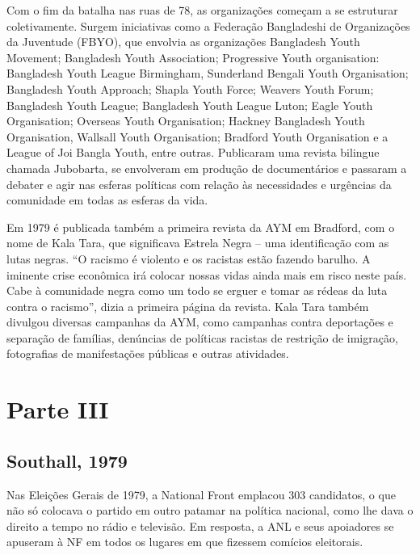 Com o fim da batalha nas ruas de 78, as organizações começam a se estruturar coletivamente. Surgem iniciativas como a Federação Bangladeshi de Organizações da Juventude (FBYO), que envolvia as organizações Bangladesh Youth Movement; Bangladesh Youth Association; Progressive Youth organisation: Bangladesh Youth League Birmingham, Sunderland Bengali Youth Organisation; Bangladesh Youth Approach; Shapla Youth Force; Weavers Youth Forum; Bangladesh Youth League; Bangladesh Youth League Luton; Eagle Youth Organisation; Overseas Youth Organisation; Hackney Bangladesh Youth Organisation, Wallsall Youth Organisation; Bradford Youth Organisation e a League of Joi Bangla Youth, entre outras. Publicaram uma revista bilingue chamada Jubobarta, se envolveram em produção de documentários e passaram a debater e agir nas esferas políticas com relação às necessidades e urgências da comunidade em todas as esferas da vida.


Em 1979 é publicada também a primeira revista da AYM em Bradford, com o nome de Kala Tara, que significava Estrela Negra – uma identificação com as lutas negras. “O racismo é violento e os racistas estão fazendo barulho. A iminente crise econômica irá colocar nossas vidas ainda mais em risco neste país. Cabe à comunidade negra como um todo se erguer e tomar as rédeas da luta contra o racismo”, dizia a primeira página da revista. Kala Tara também divulgou diversas campanhas da AYM, como campanhas contra deportações e separação de famílias, denúncias de políticas racistas de restrição de imigração, fotografias de manifestações públicas e outras atividades.

\section{Parte III}

\subsection{Southall, 1979}

Nas Eleições Gerais de 1979, a National Front emplacou 303 candidatos, o que não só colocava o partido em outro patamar na política nacional, como lhe dava o direito a tempo no rádio e televisão. Em resposta, a ANL e seus apoiadores se apuseram à NF em todos os lugares em que fizessem comícios eleitorais.

